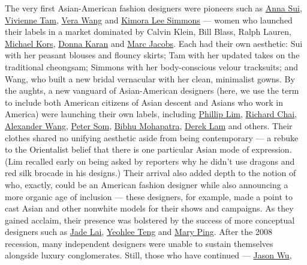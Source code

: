 The very first Asian-American fashion designers were pioneers such as
\href{https://www.nytimes.com/2017/05/11/t-magazine/fashion/anna-sui-profile-style.html}{Anna
Sui}, \href{https://www.viviennetam.com/}{Vivienne Tam},
\href{https://www.verawang.com/}{Vera Wang} and
\href{https://babyphat.com/}{Kimora Lee Simmons} --- women who launched
their labels in a market dominated by Calvin Klein, Bill Blass, Ralph
Lauren,
\href{https://www.nytimes.com/2018/04/09/t-magazine/michael-kors-80s-photos-inspiration.html}{Michael
Kors}, \href{https://www.nytimes.com/topic/person/donna-karan}{Donna
Karan} and
\href{https://www.nytimes.com/2020/02/10/t-magazine/marc-jacobs.html}{Marc
Jacobs}. Each had their own aesthetic: Sui with her peasant blouses and
flouncy skirts; Tam with her updated takes on the traditional cheongsam;
Simmons with her body-conscious velour tracksuits; and Wang, who built a
new bridal vernacular with her clean, minimalist gowns. By the aughts, a
new vanguard of Asian-American designers (here, we use the term to
include both American citizens of Asian descent and Asians who work in
America) were launching their own labels, including
\href{https://www.nytimes.com/2020/01/24/t-magazine/phillip-lim-shrimp-recipe.html}{Phillip
Lim}, \href{https://www.instagram.com/richardchai/?hl=en}{Richard Chai},
\href{https://www.alexanderwang.com/us-en/}{Alexander Wang},
\href{https://www.petersom.com/}{Peter Som},
\href{https://www.bibhu.com/}{Bibhu Mohapatra},
\href{https://www.dereklam.com/us}{Derek Lam} and others. Their clothes
shared no unifying aesthetic aside from being contemporary --- a rebuke
to the Orientalist belief that there is one particular Asian mode of
expression. (Lim recalled early on being asked by reporters why he
didn't use dragons and red silk brocade in his designs.) Their arrival
also added depth to the notion of who, exactly, could be an American
fashion designer while also announcing a more organic age of inclusion
--- these designers, for example, made a point to cast Asian and other
nonwhite models for their shows and campaigns. As they gained acclaim,
their presence was bolstered by the success of more conceptual designers
such as \href{https://www.instagram.com/lilmingling/?hl=en}{Jade Lai},
\href{https://yeohlee.com/}{Yeohlee Teng} and
\href{https://tmagazine.blogs.nytimes.com/2014/05/20/perfect-pairing-collaboration-sculptural-jewelry-mary-ping-piece-a-conviction/}{Mary
Ping}. After the 2008 recession, many independent designers were unable
to sustain themselves alongside luxury conglomerates. Still, those who
have continued ---
\href{https://www.nytimes.com/2019/09/08/t-magazine/jason-wu-newspaper-dress.html}{Jason
Wu},
